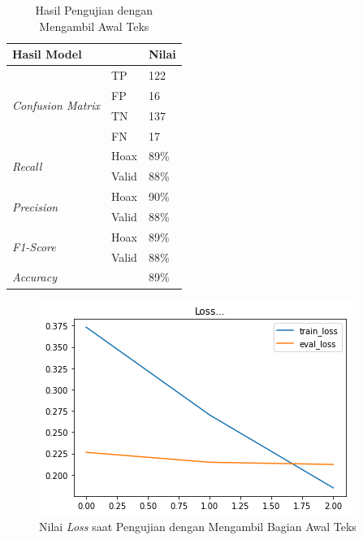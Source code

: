\begin{table}
    \caption{Hasil Pengujian dengan Mengambil Awal Teks}
    \label{tab: const_awal}
    \centering
    \begin{tabular}{|l|l|l|}
        \hline
        \multicolumn{2}{|l|}{\textbf{Hasil Model}} & \textbf{Nilai}        \\ \hline
        \multirow{4}{*}{\textit{Confusion Matrix}} & TP             & 122  \\ \cline{2-3}
                                                   & FP             & 16   \\ \cline{2-3}
                                                   & TN             & 137  \\ \cline{2-3}
                                                   & FN             & 17   \\ \hline
        \multirow{2}{*}{\textit{Recall}}           & Hoax           & 89\% \\ \cline{2-3}
                                                   & Valid          & 88\% \\ \hline
        \multirow{2}{*}{\textit{Precision}}        & Hoax           & 90\% \\ \cline{2-3}
                                                   & Valid          & 88\% \\ \hline
        \multirow{2}{*}{\textit{F1-Score}}         & Hoax           & 89\% \\ \cline{2-3}
                                                   & Valid          & 88\% \\ \hline
        \multicolumn{2}{|l|}{\textit{Accuracy}}    & 89\%                  \\ \hline
    \end{tabular}
\end{table}

\begin{figure}[h!]
    \begin{center}
        \includegraphics[width= 0.9\linewidth]{gambar/loss_concat_awal.png}
        \caption{Nilai \textit{Loss} saat Pengujian dengan Mengambil Bagian Awal Teks}
        \label{fig: loss_const_awal}
    \end{center}
\end{figure}



